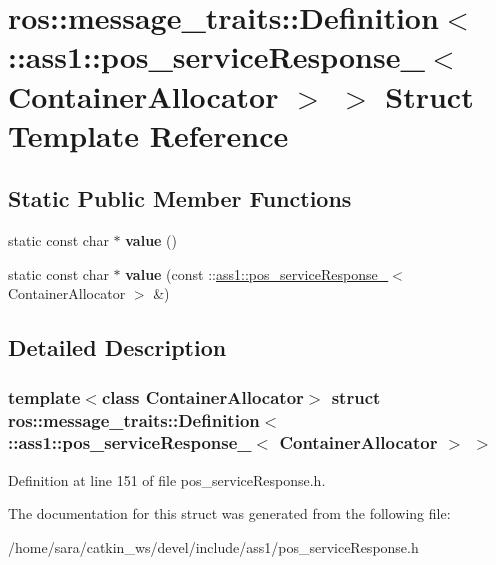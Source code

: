 \hypertarget{structros_1_1message__traits_1_1Definition_3_01_1_1ass1_1_1pos__serviceResponse___3_01ContainerAllocator_01_4_01_4}{}\section{ros\+:\+:message\+\_\+traits\+:\+:Definition$<$ \+:\+:ass1\+:\+:pos\+\_\+service\+Response\+\_\+$<$ Container\+Allocator $>$ $>$ Struct Template Reference}
\label{structros_1_1message__traits_1_1Definition_3_01_1_1ass1_1_1pos__serviceResponse___3_01ContainerAllocator_01_4_01_4}
\subsection*{Static Public Member Functions}
\begin{DoxyCompactItemize}
\item 
\mbox{\label{structros_1_1message__traits_1_1Definition_3_01_1_1ass1_1_1pos__serviceResponse___3_01ContainerAllocator_01_4_01_4_a36641962da14d5fe07ed90f2b2219083}} 
static const char $\ast$ {\bfseries value} ()
\item 
\mbox{\label{structros_1_1message__traits_1_1Definition_3_01_1_1ass1_1_1pos__serviceResponse___3_01ContainerAllocator_01_4_01_4_a0efa9952dc57c415e5cf8e73820064f1}} 
static const char $\ast$ {\bfseries value} (const \+::\hyperlink{structass1_1_1pos__serviceResponse__}{ass1\+::pos\+\_\+service\+Response\+\_\+}$<$ Container\+Allocator $>$ \&)
\end{DoxyCompactItemize}


\subsection{Detailed Description}
\subsubsection*{template$<$class Container\+Allocator$>$\newline
struct ros\+::message\+\_\+traits\+::\+Definition$<$ \+::ass1\+::pos\+\_\+service\+Response\+\_\+$<$ Container\+Allocator $>$ $>$}



Definition at line 151 of file pos\+\_\+service\+Response.\+h.



The documentation for this struct was generated from the following file\+:\begin{DoxyCompactItemize}
\item 
/home/sara/catkin\+\_\+ws/devel/include/ass1/pos\+\_\+service\+Response.\+h\end{DoxyCompactItemize}
